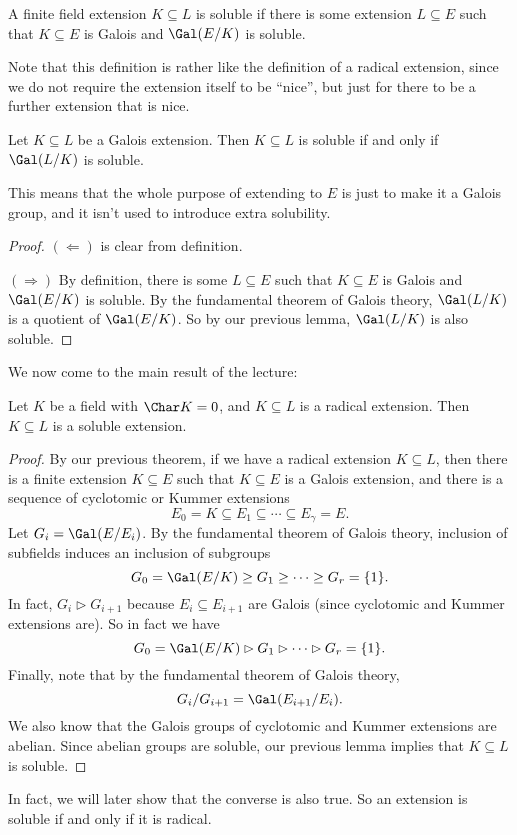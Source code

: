 \documentclass[a4paper]{article}
\begin{document}
\begin{defi}
  A finite field extension $K\subseteq L$ is soluble if there is some extension $L\subseteq E$ such that $K\subseteq E$ is Galois and $\Gal(E/K)$ is soluble.
\end{defi}
Note that this definition is rather like the definition of a radical extension, since we do not require the extension itself to be ``nice'', but just for there to be a further extension that is nice.

\begin{lemma}
  Let $K\subseteq L$ be a Galois extension. Then $K\subseteq L$ is soluble if and only if $\Gal(L/K)$ is soluble.
\end{lemma}
This means that the whole purpose of extending to $E$ is just to make it a Galois group, and it isn't used to introduce extra solubility.

\begin{proof}
  $(\Leftarrow)$ is clear from definition.

  $(\Rightarrow)$ By definition, there is some $L\subseteq E$ such that $K\subseteq E$ is Galois and $\Gal(E/K)$ is soluble. By the fundamental theorem of Galois theory, $\Gal(L/K)$ is a quotient of $\Gal(E/K)$. So by our previous lemma, $\Gal(L/K)$ is also soluble.
\end{proof}

We now come to the main result of the lecture:
\begin{thm}
  Let $K$ be a field with $\Char K = 0$, and $K \subseteq L$ is a radical extension. Then $K\subseteq L$ is a soluble extension.
\end{thm}

\begin{proof}
  By our previous theorem, if we have a radical extension $K\subseteq L$, then there is a finite extension $K\subseteq E$ such that $K\subseteq E$ is a Galois extension, and there is a sequence of cyclotomic or Kummer extensions
  \[
    E_0 = K \subseteq E_1 \subseteq \cdots \subseteq E_\gamma = E.
  \]
  Let $G_i = \Gal(E/E_i)$. By the fundamental theorem of Galois theory, inclusion of subfields induces an inclusion of subgroups
  \[
    G_0 = \Gal(E/K) \geq G_1 \geq \cdots \geq G_r = \{1\}.
  \]
  In fact, $G_i \rhd G_{i + 1}$ because $E_i \subseteq E_{i + 1}$ are Galois (since cyclotomic and Kummer extensions are). So in fact we have
  \[
    G_0 = \Gal(E/K) \rhd G_1 \rhd \cdots \rhd G_r = \{1\}.
  \]
  Finally, note that by the fundamental theorem of Galois theory,
  \[
    G_i/G_{i + 1} = \Gal(E_{i + 1}/E_i).
  \]
  We also know that the Galois groups of cyclotomic and Kummer extensions are abelian. Since abelian groups are soluble, our previous lemma implies that $K\subseteq L$ is soluble.
\end{proof}
In fact, we will later show that the converse is also true. So an extension is soluble if and only if it is radical.
\end{document}
